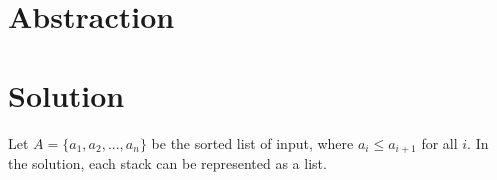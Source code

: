 \documentclass[twocolumn]{article}
\begin{document}
\section{Abstraction}

\section{Solution}
Let $A = \{ a_1 , a_2 , ... , a_n \}$ be the sorted list of input, where $ a_i \le a_{i+1}$ for all $i$.
In the solution, each stack can be represented as a list.
\end{document}
